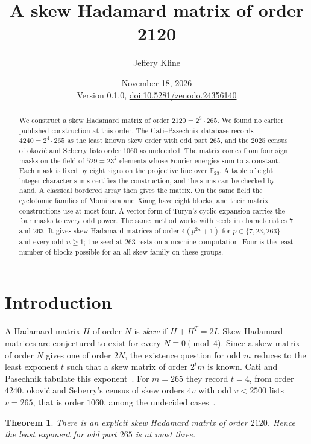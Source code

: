 \documentclass[11pt]{article}
\title{A skew Hadamard matrix of order 2120}
\author{Jeffery Kline}
\date{November 18, 2026\\[3pt]\small Version 0.1.0, \href{https://doi.org/10.5281/zenodo.24356140}{doi:10.5281/zenodo.24356140}}
\newtheorem{theorem}{Theorem}
\theoremstyle{remark}
\newcommand{\F}{\mathbb F}
\begin{document}
\maketitle

\begin{abstract}
We construct a skew Hadamard matrix of order $2120=2^3\cdot265$. We found no earlier published construction at this order. The Cati--Pasechnik database records $4240=2^4\cdot265$ as the least known skew order with odd part $265$, and the 2025 census of \DJ{}okovi\'c and Seberry lists order $1060$ as undecided. The matrix comes from four sign masks on the field of $529=23^2$ elements whose Fourier energies sum to a constant. Each mask is fixed by eight signs on the projective line over $\F_{23}$. A table of eight integer character sums certifies the construction, and the sums can be checked by hand. A classical bordered array then gives the matrix. On the same field the cyclotomic families of Momihara and Xiang have eight blocks, and their matrix constructions use at most four. A vector form of Turyn's cyclic expansion carries the four masks to every odd power. The same method works with seeds in characteristics $7$ and $263$. It gives skew Hadamard matrices of order $4(p^{2n}+1)$ for $p\in\{7,23,263\}$ and every odd $n\ge1$; the seed at $263$ rests on a machine computation. Four is the least number of blocks possible for an all-skew family on these groups.
\end{abstract}

\section{Introduction}
A Hadamard matrix $H$ of order $N$ is \emph{skew} if $H+H^T=2I$. Skew Hadamard matrices are conjectured to exist for every $N\equiv0\pmod 4$. Since a skew matrix of order $N$ gives one of order $2N$, the existence question for odd $m$ reduces to the least exponent $t$ such that a skew matrix of order $2^tm$ is known. Cati and Pasechnik tabulate this exponent~\cite[Table~5]{CP}. For $m=265$ they record $t=4$, from order $4240$. \DJ{}okovi\'c and Seberry's census of skew orders $4v$ with odd $v<2500$ lists $v=265$, that is order $1060$, among the undecided cases~\cite{DS}.

\begin{theorem}\label{main}
There is an explicit skew Hadamard matrix of order $2120$. Hence the least exponent for odd part $265$ is at most three.
\end{theorem}
\end{document}
